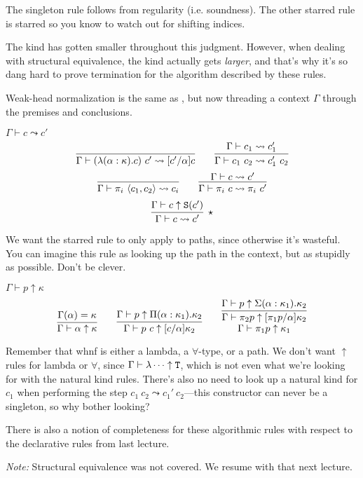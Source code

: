 The singleton rule follows from regularity (i.e. soundness). The other starred rule is starred
so you know to watch out for shifting indices.

The kind has gotten smaller throughout this judgment. However, when dealing with structural
equivalence, the kind actually gets \emph{larger}, and that's why it's so dang hard to prove
termination for the algorithm described by these rules.

Weak-head normalization is the same as , but now threading a context $\Gamma$
through the premises and conclusions.

\begin{judgment}
  $\Gamma \vdash c \leadsto c'$
  \[
    \infer{\Gamma \vdash (\lambda(\alpha : \kappa).c)~c' \leadsto [c'/\alpha]c}{}
    \qquad
    \infer{\Gamma \vdash c_1~c_2 \leadsto c_1'~c_2}{\Gamma \vdash c_1 \leadsto c_1'}
  \]
  \[
    \infer{\Gamma \vdash \pi_i~\langle c_1, c_2 \rangle \leadsto c_i}{}
    \qquad
    \infer{\Gamma \vdash \pi_i~c \leadsto \pi_i~c'}{\Gamma\vdash c \leadsto c'}
  \]
  \[
    \infer[\star]{\Gamma \vdash c \leadsto c'}{\Gamma \vdash c \uparrow \S(c')}
  \]
\end{judgment}

We want the starred rule to only apply to paths, since otherwise it's wasteful. You can
imagine this rule as looking up the path in the context, but as stupidly as possible. Don't
be clever.

\begin{judgment}
  $\Gamma \vdash p \uparrow \kappa$
  \[
    \infer{\Gamma \vdash \alpha \uparrow \kappa}{\Gamma(\alpha) = \kappa}
    \qquad
    \infer{\Gamma \vdash p~c \uparrow [c/\alpha]\kappa_2}
      {\Gamma \vdash p \uparrow \Pi(\alpha : \kappa_1).\kappa_2}
    \qquad
    \infer
      {\deduce
        {\Gamma \vdash \pi_1p \uparrow \kappa_1}
        {\Gamma \vdash \pi_2p \uparrow [\pi_1p/\alpha]\kappa_2}
      }
      {\Gamma \vdash p \uparrow \Sigma(\alpha : \kappa_1).\kappa_2}
  \]
\end{judgment}

Remember that whnf is either a lambda, a $\forall$-type, or a path. We don't want $\uparrow$ rules
for lambda or $\forall$, since $\Gamma \vdash \lambda \cdots \uparrow \textnormal{\texttt{T}}$, which is not even
what we're looking for with the natural kind rules. There's also no need to look up
a natural kind for $c_1$ when performing the step $c_1~c_2 \leadsto c_1'~c_2$---this
constructor can never be a singleton, so why bother looking?

There is also a notion of completeness for these algorithmic rules with respect to the
declarative rules from last lecture.

\emph{Note:} Structural equivalence was not covered. We resume with that next lecture.

